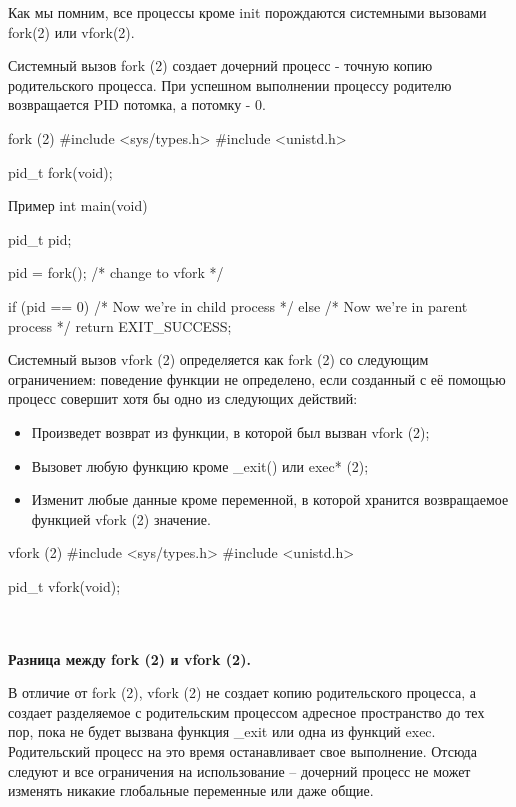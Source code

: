 Как мы помним, все процессы кроме init порождаются системными вызовами fork(2) или vfork(2). 

Системный вызов fork (2) создает дочерний процесс - точную копию родительского процесса. При успешном выполнении процессу родителю возвращается PID потомка, а потомку - 0.

\begin{CCode}{fork (2)}
	#include <sys/types.h>
	#include <unistd.h>
	
	pid_t fork(void); \end{CCode}

\begin{CCode}{Пример}
	int main(void) {
		pid_t pid;

		pid = fork(); /* change to vfork */
	
	    if (pid == 0) {
	        /* Now we're in child process */
		}   
		else {
			/* Now we're in parent process */
		}
		return EXIT_SUCCESS; 
	} \end{CCode}


Системный вызов vfork (2) определяется как fork (2) со следующим ограничением: поведение функции не определено, если созданный с её помощью процесс совершит хотя бы одно из следующих действий:

\begin{itemize}
	\item Произведет возврат из функции, в которой был вызван vfork (2);
	\item Вызовет любую функцию кроме \_exit() или exec* (2);
	\item Изменит любые данные кроме переменной, в которой хранится возвращаемое функцией vfork (2) значение.
\end{itemize}

\begin{CCode}{vfork (2)}
	#include <sys/types.h>
	#include <unistd.h>

	pid_t vfork(void); \end{CCode}

~\\~\\
\textbf{Разница между fork (2) и vfork (2).}

В отличие от fork (2), vfork (2) не создает копию родительского процесса, а создает разделяемое с родительским процессом адресное пространство до тех пор, пока не будет вызвана функция \_exit или одна из функций exec.
Родительский процесс на это время останавливает свое выполнение. Отсюда следуют и все ограничения на использование – дочерний процесс не может изменять никакие глобальные переменные или даже общие.

